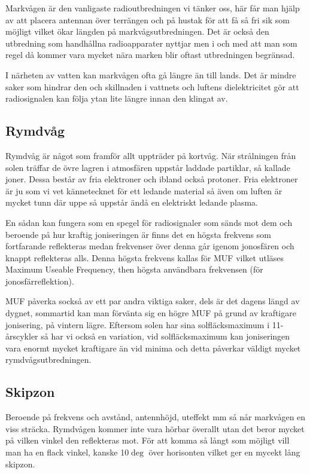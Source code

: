 Markvågen är den vanligaste radioutbredningen vi tänker oss, här får man hjälp
av att placera antennan över terrängen och på hustak för att få så fri sik som
möjligt vilket ökar längden på markvågsutbredningen. Det är också den
utbredning som handhållna radioapparater nyttjar men i och med att man som
regel då kommer vara mycket nära marken blir oftast utbredningen begränsad.

I närheten av vatten kan markvågen ofta gå längre än till lands. Det är mindre
saker som hindrar den och skillnaden i vattnets och luftens dielektricitet gör
att radiosignalen kan följa ytan lite längre innan den klingat av.

\subsection{Rymdvåg}

Rymdvåg är något som framför allt uppträder på kortvåg. När strålningen från
solen träffar de övre lagren i atmosfären uppstår laddade partiklar, så
kallade joner. Dessa består av fria elektroner och ibland också protoner. Fria
elektroner är ju som vi vet kännetecknet för ett ledande material så även om
luften är mycket tunn där uppe så uppstår ändå en elektriskt ledande plasma.

En sådan kan fungera som en spegel för radiosignaler som sänds mot dem och
beroende på hur kraftig joniseringen är finns det en högsta frekvens som
fortfarande reflekteras medan frekvenser över denna går igenom jonosfären och
knappt reflekteras alls. Denna högsta frekvens kallas för MUF vilket utläses
Maximum Useable Frequency, then högsta användbara frekvensen (för
jonosfärreflektion).

MUF påverka sockså av ett par andra viktiga saker, dels är det dagens längd av
dygnet, sommartid kan man förvänta sig en högre MUF på grund av kraftigare
jonisering, på vintern lägre. Eftersom solen har sina solfläcksmaximum i
11-årscykler så har vi också en variation, vid solfläcksmaximum kan
joniseringen vara enormt mycket kraftigare än vid minima och detta påverkar
väldigt mycket rymdvågsutbredningen.

\subsection{Skipzon}

Beroende på frekvens och avstånd, antennhöjd, uteffekt mm så når markvågen en
viss sträcka. Rymdvågen kommer inte vara hörbar överallt utan det beror mycket
på vilken vinkel den reflekteras mot. För att komma så långt som möjligt vill
man ha en flack vinkel, kanske 10$\deg$ över horisonten vilket ger en mycekt
lång skipzon.

